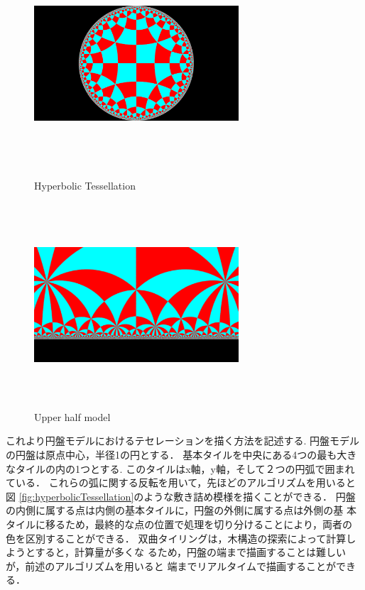 \begin{figure}[h!tbp]
 \begin{minipage}{0.49\hsize}
  \center
  \includegraphics[width=3in, height=3in,
  keepaspectratio]{../img/tessellation/hyperbolicTessellation.pdf}
  \caption{Hyperbolic Tessellation}
  \label{fig:hyperbolicTessellation}
 \end{minipage}
 \hspace*{\fill}
 \begin{minipage}{0.49\hsize}
  \center
  \includegraphics[width=3in, height=3in, keepaspectratio]{../img/tessellation/upperHalf.pdf}
  \caption{Upper half model}
  \label{fig:upperHalf}
 \end{minipage}
\end{figure}

これより円盤モデルにおけるテセレーションを描く方法を記述する.
円盤モデルの円盤は原点中心，半径1の円とする．
基本タイルを中央にある4つの最も大きなタイルの内の1つとする.
このタイルはx軸，y軸，そして２つの円弧で囲まれている．
これらの弧に関する反転を用いて，先ほどのアルゴリズムを用いると図
\ref{fig:hyperbolicTessellation}のような敷き詰め模様を描くことができる．
円盤の内側に属する点は内側の基本タイルに，円盤の外側に属する点は外側の基
本タイルに移るため，最終的な点の位置で処理を切り分けることにより，両者の
色を区別することができる．
双曲タイリングは，木構造の探索によって計算しようとすると，計算量が多くな
るため，円盤の端まで描画することは難しいが，前述のアルゴリズムを用いると
端までリアルタイムで描画することができる．


